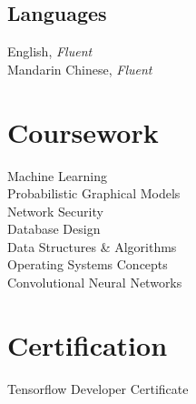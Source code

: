 \documentclass{fortythree_resume}
\begin{document}
\begin{minipage}[t]{0.33\textwidth}
\subsection{Languages}
English, \emph{Fluent}\\
Mandarin Chinese, \emph{Fluent}\\
\sectionsep

\section{Coursework}
Machine Learning\\
Probabilistic Graphical Models\\
Network Security\\
Database Design\\
Data Structures \& Algorithms\\
Operating Systems Concepts\\
Convolutional Neural Networks
\sectionsep

\section{Certification}
Tensorflow Developer Certificate

\end{minipage}
\hfill
\end{document}
